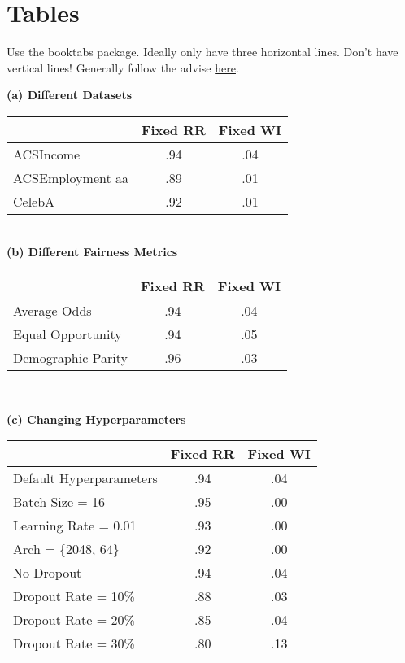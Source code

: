 \section{Tables}\label{sec:tables}

Use the booktabs package. Ideally only have three horizontal lines. Don't have vertical lines! Generally follow the advise \href{https://people.inf.ethz.ch/markusp/teaching/guides/guide-tables.pdf}{here}.


\begin{table*}
	\begin{center}
		\caption{Some tables}
		\label{tab:correlation_others}
		\begin{minipage}{0.48\textwidth}
			\centering
			\textbf{(a) Different Datasets}\\[0.2cm]
			\begin{tabular}{lcc}
				\toprule
				& Fixed RR & Fixed WI \\
				\midrule
				ACSIncome & .94 & .04 \\
				ACSEmployment {\color{white}aa} & .89 & .01 \\
				CelebA & .92 & .01 \\
				\bottomrule
			\end{tabular} \\ [0.2cm]
			\textbf{(b) Different Fairness Metrics}\\[0.2cm]
			\begin{tabular}{lcc}
				\toprule
				& Fixed RR & Fixed WI \\
				\midrule
				Average Odds & .94 & .04 \\
				Equal Opportunity & .94 & .05 \\
				Demographic Parity & .96 & .03 \\
				\bottomrule
			\end{tabular} \\
		\end{minipage}\hfill
		\begin{minipage}{0.48\textwidth}
			\centering
			\textbf{(c) Changing Hyperparameters}\\[0.2cm]
			\begin{tabular}{lcc}
				\toprule
				& Fixed RR & Fixed WI \\
				\midrule
				Default Hyperparameters & .94 & .04 \\
				Batch Size = 16 & .95 & .00 \\
				Learning Rate = 0.01 & .93 & .00 \\
				Arch = \{2048, 64\} & .92 & .00 \\
				\addlinespace[2ex]
				No Dropout & .94 & .04 \\
				Dropout Rate = 10\% & .88 & .03 \\
				Dropout Rate = 20\% & .85 & .04 \\
				Dropout Rate = 30\% & .80 & .13 \\
				\bottomrule
			\end{tabular} \\ [0.2cm]
		\end{minipage}\hfill
	\end{center}
\end{table*}